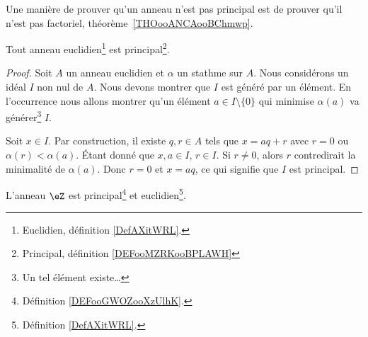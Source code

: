 Une manière de prouver qu'un anneau n'est pas principal est de prouver qu'il n'est pas factoriel, théorème~\ref{THOooANCAooBChmwp}.


\begin{proposition}\label{Propkllxnv}
	Tout anneau euclidien\footnote{Euclidien, définition \ref{DefAXitWRL}.} est principal\footnote{Principal, définition \ref{DEFooMZRKooBPLAWH}}.
\end{proposition}

\begin{proof}
	Soit \( A\) un anneau euclidien et \( \alpha\) un stathme sur \( A\). Nous considérons un idéal \( I\) non nul de \( A\). Nous devons montrer que \( I\) est généré par un élément. En l'occurrence nous allons montrer qu'un élément \( a\in I\setminus\{ 0 \}\) qui minimise \( \alpha(a)\) va générer\footnote{Un tel élément existe\dots} \( I\).

	Soit \( x\in I\). Par construction, il existe \( q,r\in A\) tels que \( x=aq+r\) avec \( r=0\) ou \( \alpha(r)<\alpha(a)\). Étant donné que \( x,a\in I\), \( r\in I\). Si \( r\neq 0\), alors \( r\) contredirait la minimalité de \( \alpha(a)\). Donc \( r=0\) et \( x=aq\), ce qui signifie que \( I\) est principal.
\end{proof}

\begin{proposition}     \label{PROPooPJGLooQSrJTU}
	L'anneau \( \eZ\) est principal\footnote{Définition \ref{DEFooGWOZooXzUlhK}.} et euclidien\footnote{Définition \ref{DefAXitWRL}.}.
\end{proposition}

